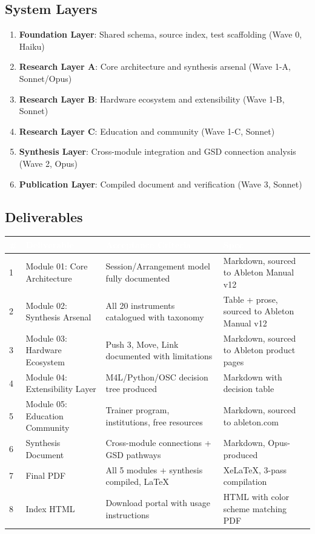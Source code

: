 \documentclass[11pt,letterpaper]{article}
\newcommand{\tableheader}[1]{\textbf{\sffamily\textcolor{white}{#1}}}
\begin{document}
\subsection{System Layers}

\begin{enumerate}
  \item \textbf{Foundation Layer}: Shared schema, source index, test scaffolding (Wave 0, Haiku)
  \item \textbf{Research Layer A}: Core architecture and synthesis arsenal (Wave 1-A, Sonnet/Opus)
  \item \textbf{Research Layer B}: Hardware ecosystem and extensibility (Wave 1-B, Sonnet)
  \item \textbf{Research Layer C}: Education and community (Wave 1-C, Sonnet)
  \item \textbf{Synthesis Layer}: Cross-module integration and GSD connection analysis (Wave 2, Opus)
  \item \textbf{Publication Layer}: Compiled document and verification (Wave 3, Sonnet)
\end{enumerate}

\subsection{Deliverables}

\begin{center}
\begin{tabularx}{\textwidth}{C{0.5cm}L{4cm}L{3.5cm}X}
\toprule
{}
\tableheader{\#} & \tableheader{Deliverable} & \tableheader{Acceptance Criteria} & \tableheader{Spec} \\
 & Module 01: Core Architecture & Session/Arrangement model fully documented & Markdown, sourced to Ableton Manual v12 \\
2 & Module 02: Synthesis Arsenal & All 20 instruments catalogued with taxonomy & Table + prose, sourced to Ableton Manual v12 \\
3 & Module 03: Hardware Ecosystem & Push 3, Move, Link documented with limitations & Markdown, sourced to Ableton product pages \\
4 & Module 04: Extensibility Layer & M4L/Python/OSC decision tree produced & Markdown with decision table \\
5 & Module 05: Education Community & Trainer program, institutions, free resources & Markdown, sourced to ableton.com \\
6 & Synthesis Document & Cross-module connections + GSD pathways & Markdown, Opus-produced \\
7 & Final PDF & All 5 modules + synthesis compiled, LaTeX & XeLaTeX, 3-pass compilation \\
8 & Index HTML & Download portal with usage instructions & HTML with color scheme matching PDF \\
\bottomrule
\end{tabularx}
\end{center}
\end{document}
